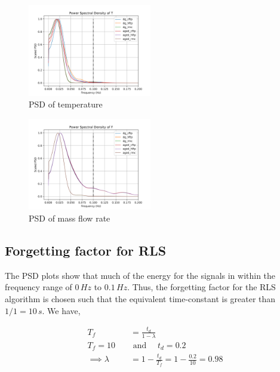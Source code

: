 \begin{multicols}{2}
       \begin{figure}[H]
        \centering
        \includegraphics[width=0.48\textwidth]{./figs/bfr_smth/test_psd/T.png}
        \caption{PSD of temperature}
       \end{figure}

       \begin{figure}[H]
        \centering
        \includegraphics[width=0.48\textwidth]{./figs/bfr_smth/test_psd/F.png}
        \caption{PSD of mass flow rate}
       \end{figure}
\end{multicols}


\subsection{Forgetting factor for RLS}

The PSD plots show that much of the energy for the signals in within the frequency range of $0 \, Hz$ to $0.1 \, Hz$. Thus, the forgetting factor for the RLS algorithm is chosen such that the equivalent time-constant is greater than $1/1 = 10 \, s$. We have,

\begin{align*}
        T_f &= \frac{t_d}{1 - \lambda}\\
        T_f = 10 \quad &\text{ and } \quad t_d = 0.2\\
        \implies \lambda &= 1 - \frac{t_d}{T_f} = 1 - \frac{0.2}{10} = 0.98
\end{align*}


